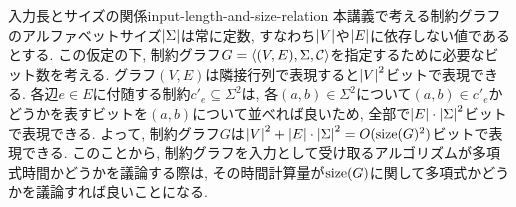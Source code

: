 \begin{remark}{入力長とサイズの関係}{input-length-and-size-relation}
  本講義で考える制約グラフのアルファベットサイズ$\abs{\Sigma}$は常に定数, すなわち$\abs{V}$や$\abs{E}$に依存しない値であるとする.
  この仮定の下, 制約グラフ$G=\langle(V,E),\Sigma,\mathcal{C}\rangle$を指定するために必要なビット数を考える.
  グラフ$(V,E)$は隣接行列で表現すると$\abs{V}^2$ビットで表現できる.
  各辺$e\in E$に付随する制約$c'_e\subseteq\Sigma^2$は, 各$(a,b)\in\Sigma^2$について$(a,b)\in c'_e$かどうかを表すビットを$(a,b)$について並べれば良いため, 全部で$\abs{E}\cdot\abs{\Sigma}^2$ビットで表現できる.
  よって, 制約グラフ$G$は$\abs{V}^2+\abs{E}\cdot\abs{\Sigma}^2 = O(\mathrm{size}(G)^2)$ビットで表現できる.
  このことから, 制約グラフを入力として受け取るアルゴリズムが多項式時間かどうかを議論する際は, その時間計算量が$\mathrm{size}(G)$に関して多項式かどうかを議論すれば良いことになる.
\end{remark}

